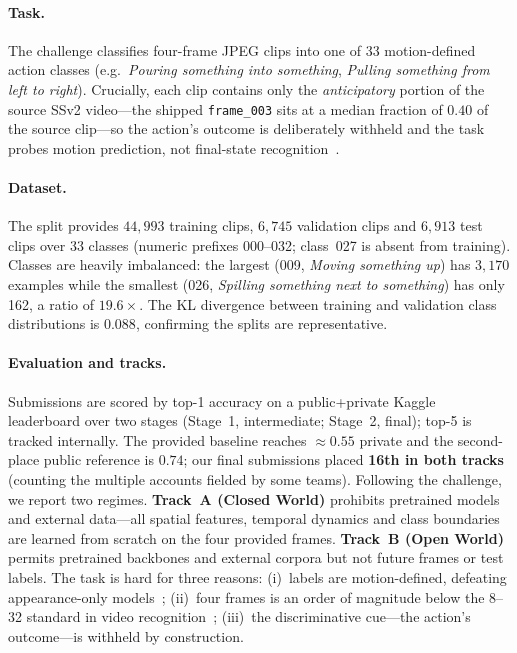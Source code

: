 \documentclass[10pt,twocolumn,letterpaper]{article}
\begin{document}
\paragraph{Task.}
The challenge classifies four-frame JPEG clips into one of 33 motion-defined
action classes (e.g.\ \emph{Pouring something into something}, \emph{Pulling
something from left to right}). Crucially, each clip contains only the
\emph{anticipatory} portion of the source SSv2 video---the shipped
\texttt{frame\_003} sits at a median fraction of $0.40$ of the source clip---so
the action's outcome is deliberately withheld and the task probes motion
prediction, not final-state recognition~\cite{goyal2017ssv2}.

\paragraph{Dataset.}
The split provides $44{,}993$ training clips, $6{,}745$ validation clips and
$6{,}913$ test clips over 33 classes (numeric prefixes 000--032; class~027 is
absent from training). Classes are heavily imbalanced: the largest (009,
\emph{Moving something up}) has $3{,}170$ examples while the smallest (026,
\emph{Spilling something next to something}) has only 162, a ratio of
$19.6\times$. The KL divergence between training and validation class
distributions is $0.088$, confirming the splits are representative.

\paragraph{Evaluation and tracks.}
Submissions are scored by top-1 accuracy on a public+private Kaggle leaderboard
over two stages (Stage~1, intermediate; Stage~2, final); top-5 is tracked
internally. The provided baseline reaches ${\approx}0.55$ private and the
second-place public reference is $0.74$; our final submissions placed
\textbf{16th in both tracks} (counting the multiple accounts fielded by some
teams). Following the challenge, we report two regimes. \textbf{Track~A (Closed
World)} prohibits pretrained models and external data---all spatial features,
temporal dynamics and class boundaries are learned from scratch on the four
provided frames. \textbf{Track~B (Open World)} permits pretrained backbones and
external corpora but not future frames or test labels. The task is hard for
three reasons: (i)~labels are motion-defined, defeating appearance-only
models~\cite{goyal2017ssv2}; (ii)~four frames is an order of magnitude below the
8--32 standard in video recognition~\cite{lin2019tsm,bertasius2021timesformer};
(iii)~the discriminative cue---the action's outcome---is withheld by
construction.
\end{document}
